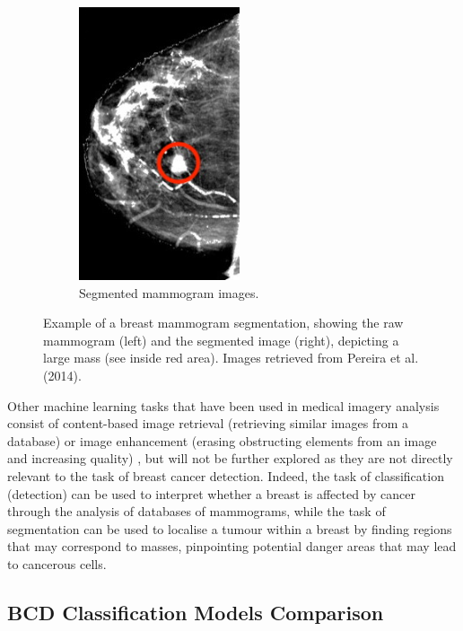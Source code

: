 \begin{figure}[h]
\begin{subfigure}{.5\textwidth}
  \includegraphics[width=0.52\textwidth]{Dissertation/figures/litsurvey/segmented-mammogram.jpg}
  \caption{Segmented mammogram images.}
  \label{fig:segmented-mammogram}
\end{subfigure}
\caption{\label{fig:segmentation_example}Example of a breast mammogram segmentation, showing the raw mammogram (left) and the segmented image (right), depicting a large mass (see inside red area). Images retrieved from Pereira et al. (2014).}
\end{figure}

Other machine learning tasks that have been used in medical imagery analysis consist of content-based image retrieval (retrieving similar images from a database) or image enhancement (erasing obstructing elements from an image and increasing quality) \cite{Litjens2017}, but will not be further explored as they are not directly relevant to the task of breast cancer detection. Indeed, the task of classification (detection) can be used to interpret whether a breast is affected by cancer through the analysis of databases of mammograms, while the task of segmentation can be used to localise a tumour within a breast by finding regions that may correspond to masses, pinpointing potential danger areas that may lead to cancerous cells.

\subsection{BCD Classification Models Comparison}


